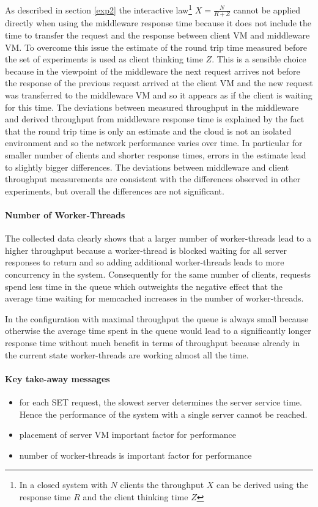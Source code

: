 \documentclass[report.tex]{subfiles}
\begin{document}
As described in section \ref{exp2} the interactive law\footnote{In a closed system with $N$ clients the throughput $X$ can be derived using the response time $R$ and the client thinking time $Z$} $X = \frac{N}{R+Z}$ cannot be applied directly when using the middleware response time because it does not include the time to transfer the request and the response between client VM and middleware VM. To overcome this issue the estimate of the round trip time measured before the set of experiments is used as client thinking time $Z$. This is a sensible choice because in the viewpoint of the middleware the next request arrives not before the response of the previous request arrived at the client VM and the new request was transferred to the middleware VM and so it appears as if the client is waiting for this time.
The deviations between measured throughput in the middleware and derived throughput from middleware response time is explained by the fact that the round trip time is only an estimate and the cloud is not an isolated environment and so the network performance varies over time. In particular for smaller number of clients and shorter response times, errors in the estimate lead to slightly bigger differences.
The deviations between middleware and client throughput measurements are consistent with the differences observed in other experiments, but overall the differences are not significant.


\paragraph{Number of Worker-Threads}
The collected data clearly shows that a larger number of worker-threads lead to a higher throughput because a worker-thread is blocked waiting for all server responses to return and so adding additional worker-threads leads to more concurrency in the system. Consequently for the same number of clients, requests spend less time in the queue which outweights the negative effect that the average time waiting for memcached increases in the number of worker-threads.

In the configuration with maximal throughput the queue is always small because otherwise the average time spent in the queue would lead to a significantly longer response time without much benefit in terms of throughput because already in the current state worker-threads are working almost all the time. 


\paragraph{Key take-away messages}
\begin{itemize}
	\vitemsep
	\item for each SET request, the slowest server determines the server service time. Hence the performance of the system with a single server cannot be reached.
	\item placement of server VM important factor for performance
	\item number of worker-threads is important factor for performance
\end{itemize}
\end{document}
